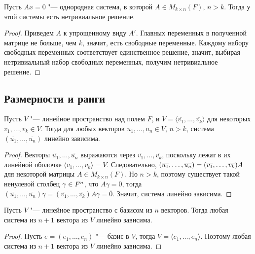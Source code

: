 \begin{proposition}
	Пусть $Ax = 0$ "--- однородная система, в которой $A \in M_{k \times n}(F)$, $n > k$. Тогда у этой системы есть нетривиальное решение.
\end{proposition}

\begin{proof}
	Приведем $A$ к упрощенному виду $A'$. Главных переменных в полученной матрице не больше, чем $k$, значит, есть свободные переменные. Каждому набору свободных переменных соответствует единственное решение, значит, выбирая нетривиальный набор свободных переменных, получим нетривиальное решение.
\end{proof}

\subsection{Размерности и ранги}

\begin{theorem}
	Пусть $V$ "--- линейное пространство над полем $F$, и $V = \langle\overline{v_1}, \dots, \overline{v_k}\rangle$ для некоторых $\overline{v_1}, \dotsc, \overline{v_k} \in V$. Тогда для любых векторов $\overline{u_1}, \dots, \overline{u_n} \in V$, $n > k$, система $(\overline{u_1}, \dots, \overline{u_n})$ линейно зависима.
\end{theorem}

\begin{proof}
	Векторы $\overline{u_1}, \dots, \overline{u_n}$ выражаются через $\overline{v_1}, \dots, \overline{v_k}$, поскольку лежат в их линейной оболочке $\langle\overline{v_1}, \dots, \overline{v_k}\rangle = V$. Следовательно, $(\overline{u_1}, \dots, \overline{u_n}) \hm{=} (\overline{v_1}, \dots, \overline{v_k})A$ для некоторой матрицы $A \in M_{k \times n}(F)$. Но $n > k$, поэтому существует такой ненулевой столбец $\gamma \hm{\in} F^n$, что $A\gamma = 0$, тогда $(\overline{u_1}, \dots, \overline{u_n})\gamma = (\overline{v_1}, \dots, \overline{v_k})A\gamma = \overline{0}$. Значит, система линейно зависима.
\end{proof}

\begin{corollary}
	Пусть $V$ "--- линейное пространство с базисом из $n$ векторов. Тогда любая система из $n + 1$ вектора из $V$ линейно зависима.
\end{corollary}

\begin{proof}
	Пусть $e = (\overline{e_1}, \dots, \overline{e_n})$ "--- базис в $V$, тогда $V = \langle\overline{e_1}, \dots, \overline{e_n}\rangle$. Поэтому любая система из $n + 1$ вектора из $V$ линейно зависима.
\end{proof}

